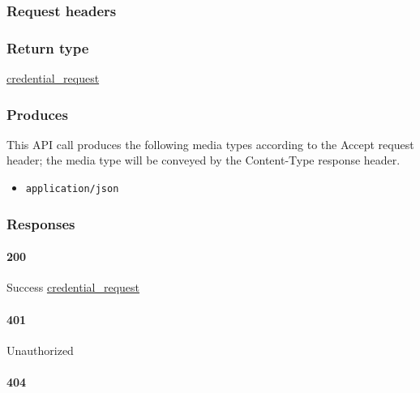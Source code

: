 \hypertarget{request-headers-70}{%
\subsubsection{Request headers}\label{request-headers-70}}

\hypertarget{return-type-92}{%
\subsubsection{Return type}\label{return-type-92}}

\protect\hyperlink{credential_request}{credential\_request}

\hypertarget{produces-119}{%
\subsubsection{Produces}\label{produces-119}}

This API call produces the following media types according to the
{Accept} request header; the media type will be conveyed by the
{Content-Type} response header.

\begin{itemize}
\tightlist
\item
  \texttt{application/json}
\end{itemize}

\hypertarget{responses-122}{%
\subsubsection{Responses}\label{responses-122}}

\hypertarget{section-398}{%
\paragraph{200}\label{section-398}}

Success \protect\hyperlink{credential_request}{credential\_request}

\hypertarget{section-399}{%
\paragraph{401}\label{section-399}}

Unauthorized \protect\hyperlink{}{}

\hypertarget{section-400}{%
\paragraph{404}\label{section-400}}

